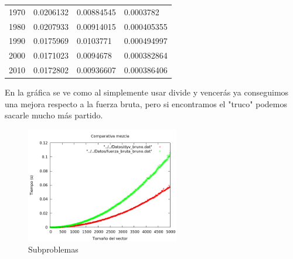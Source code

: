 \begin{center}
\begin{longtable}{l|l|l|l}
1970                                                   & 0.0206132                                                         & 0.00884545                                               & 0.0003782                                                          \\
1980                                                   & 0.0207933                                                         & 0.00914015                                               & 0.000405355                                                        \\
1990                                                   & 0.0175969                                                         & 0.0103771                                                & 0.000494997                                                        \\
2000                                                   & 0.0171023                                                         & 0.0094678                                                & 0.000382864                                                        \\
2010                                                   & 0.0172802                                                         & 0.00936607                                               & 0.000386406                                                       
\end{longtable}
\end{center}

En la gráfica se ve como al simplemente usar divide y vencerás ya conseguimos una mejora respecto a la fuerza bruta, pero si encontramos el "truco" podemos sacarle mucho más partido.

\begin{figure}[htb] 
\centering
	\includegraphics[width=0.6\textwidth]{../Opcional/Graficas/comparativa.png}
	\caption{Subproblemas} 
	\label{fig:perros} 
\end{figure}

